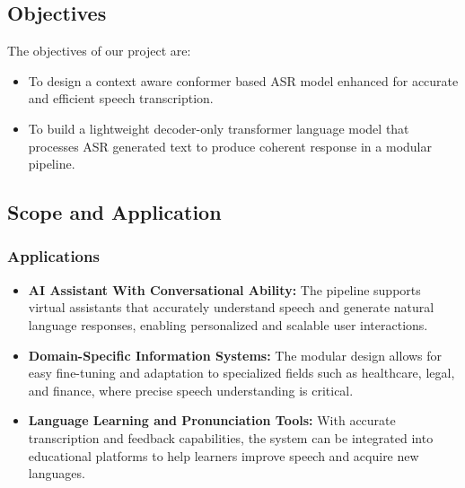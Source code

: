 \subsection{Objectives}
The objectives of our project are: 
\begin{itemize}
    \item To design a context aware conformer based ASR model enhanced for accurate and efficient speech transcription.
    \item To build a lightweight decoder-only transformer language model that processes ASR generated text to produce coherent response in a modular pipeline.
\end{itemize}

\subsection{Scope and Application}

    \subsubsection{Applications}
    \begin{itemize}
        \item \textbf{AI Assistant With Conversational Ability: }The pipeline supports virtual assistants that accurately understand speech and generate natural language responses, enabling personalized and scalable user interactions.
        \item \textbf{Domain-Specific Information Systems: }The modular design allows for easy fine-tuning and adaptation to specialized fields such as healthcare, legal, and finance, where precise speech understanding is critical.
        \item \textbf{Language Learning and Pronunciation Tools: } With accurate transcription and feedback capabilities, the system can be integrated into educational platforms to help learners improve speech and acquire new languages.
    \end{itemize}
    
